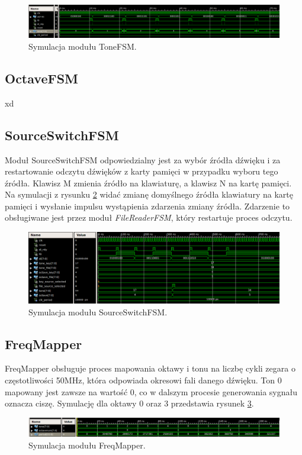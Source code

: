 \documentclass[12pt]{article}
\begin{document}
\begin{figure}[h]
  \centering
  \includegraphics[decodearray={1 0 1 0 1 0}, width=\linewidth]{images/tone}
  \caption{Symulacja modułu ToneFSM.}
  \label{sim:tone}
\end{figure}
\subsection{OctaveFSM}
xd
\subsection{SourceSwitchFSM}
Moduł SourceSwitchFSM odpowiedzialny jest za wybór źródła dźwięku i za restartowanie odczytu dźwięków z karty pamięci w przypadku wyboru tego źródła. Klawisz M zmienia źródło na klawiaturę, a klawisz N na kartę pamięci. Na symulacji z rysunku \ref{sim:source} widać zmianę domyślnego źródła klawiatury na kartę pamięci i wysłanie impulsu wystąpienia zdarzenia zmiany źródła. Zdarzenie to obsługiwane jest przez moduł \textit{FileReaderFSM}, który restartuje proces odczytu.
\begin{figure}[h]
  \centering
  \includegraphics[decodearray={1 0 1 0 1 0}, width=\linewidth]{images/source}
  \caption{Symulacja modułu SourceSwitchFSM.}
  \label{sim:source}
\end{figure}
\subsection{FreqMapper}
FreqMapper obsługuje proces mapowania oktawy i tonu na liczbę cykli zegara o częstotliwości 50MHz, która odpowiada okresowi fali danego dźwięku. Ton 0 mapowany jest zawsze na wartość 0, co w dalszym procesie generowania sygnału oznacza ciszę. Symulację dla oktawy 0 oraz 3 przedstawia rysunek \ref{sim:mapper}.
\begin{figure}[h]
  \centering
  \includegraphics[decodearray={1 0 1 0 1 0}, width=\linewidth]{images/mapper}
  \caption{Symulacja modułu FreqMapper.}
  \label{sim:mapper}
\end{figure}
\end{document}
